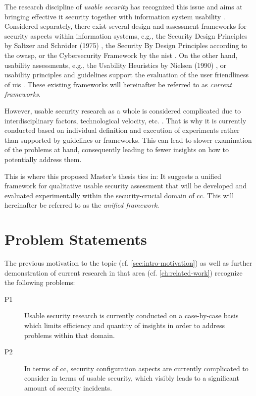 The research discipline of \textit{usable security} has recognized this issue and aims at bringing effective \ac{it} security together with information system usability \cite{garfinkel_usable_2014}. Considered separately, there exist several  design and assessment frameworks for security aspects within information systems, e.g., the Security Design Principles by Saltzer and Schröder (1975) \cite{saltzer_protection_1975}, the Security By Design Principles according to the \ac{owasp}, or the Cybersecurity Framework by the \ac{nist} \cite{noauthor_framework_2018}. On the other hand, usability assessments, e.g., the Usability Heuristics by Nielsen (1990) \cite{nielsen_heuristic_1990}, or usability principles and guidelines support the evaluation of the user friendliness of \acp{ui} \cite{moran_usability_2019}. These existing frameworks will hereinafter be referred to as \textit{current frameworks}.

However, usable security research as a whole is considered complicated due to interdisciplinary factors, technological velocity, etc. \cite{garfinkel_usable_2014}. That is why it is currently conducted based on individual definition and execution of experiments rather than supported by guidelines or frameworks. This can lead to slower examination of the problems at hand, consequently leading to fewer insights on how to potentially address them.

This is where this proposed Master's thesis ties in: It suggests a unified framework for qualitative usable security assessment that will be developed and evaluated experimentally within the security-crucial domain of \ac{cc}. This will hereinafter be referred to as the \textit{unified framework}.

\section{Problem Statements} \label{sec:intro-problems}

The previous motivation to the topic (cf. \autoref{sec:intro-motivation}) as well as further demonstration of current research in that area (cf. \autoref{ch:related-work}) recognize the following problems:

\begin{description}
	\item[P1] Usable security research is currently conducted on a case-by-case basis which limits efficiency and quantity of insights in order to address problems within that domain.
	\item[P2] In terms of \ac{cc}, security configuration aspects are currently complicated to consider in terms of usable security, which visibly leads to a significant amount of security incidents.
\end{description}

